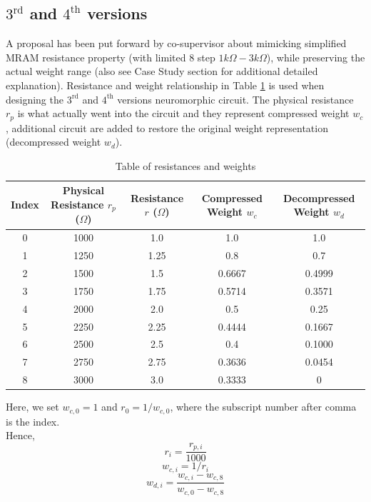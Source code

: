 \subsection{$\text{3}^{\text{rd}}$ and $\text{4}^{\text{th}}$ versions}
A proposal has been put forward by co-supervisor about mimicking simplified MRAM resistance property (with limited 8 step $1k\Omega-3k\Omega$), while preserving the actual weight range (also see Case Study section for additional detailed explanation). Resistance and weight relationship in Table \ref{fig:rnw} is used when designing the $\text{3}^{\text{rd}}$ and $\text{4}^{\text{th}}$ versions neuromorphic circuit. The physical resistance $r_{p}$ is what actually went into the circuit and they represent compressed weight $w_{c}$, additional circuit are added to restore the original weight representation (decompressed weight $w_{d}$).
\begin{table}[H]
	\centering
	\begin{tabular}[t]{ccccc}
		\hline
		Index & Physical Resistance $r_{p}$ ($\Omega$) & Resistance $r$ ($\Omega$) & Compressed Weight $w_{c}$ & Decompressed Weight $w_{d}$\\
		\hline
		\hline
		0 & 1000 & 1.0 & 1.0 & 1.0\\
		1 & 1250 & 1.25 & 0.8 & 0.7\\
		2 & 1500 & 1.5 & 0.6667 & 0.4999\\
		3 & 1750 &  1.75 & 0.5714 & 0.3571\\
		4 & 2000 & 2.0 & 0.5 & 0.25\\
		5 & 2250 & 2.25 & 0.4444 & 0.1667\\
		6 & 2500 & 2.5 & 0.4 & 0.1000\\
		7 & 2750 & 2.75 & 0.3636 & 0.0454\\
		8 & 3000 & 3.0 & 0.3333 & 0\\            
		\hline
	\end{tabular}
	\caption{Table of resistances and weights}
	\label{fig:rnw}
\end{table}
Here, we set
$w_{c,0} = 1$ and $r_{0} = 1/w_{c,0}$, where the subscript number after comma is the index.\\
Hence,
$$r_i = \frac{r_{p,i}}{1000}$$
\begin{equation}
\label{eq:rwmap}
w_{c,i} = 1/r_i
\end{equation}
\begin{equation}
\label{eq:wmap}
w_{d,i} = \frac{w_{c,i}-w_{c,8}}{w_{c,0}-w_{c,8}}
\end{equation}


